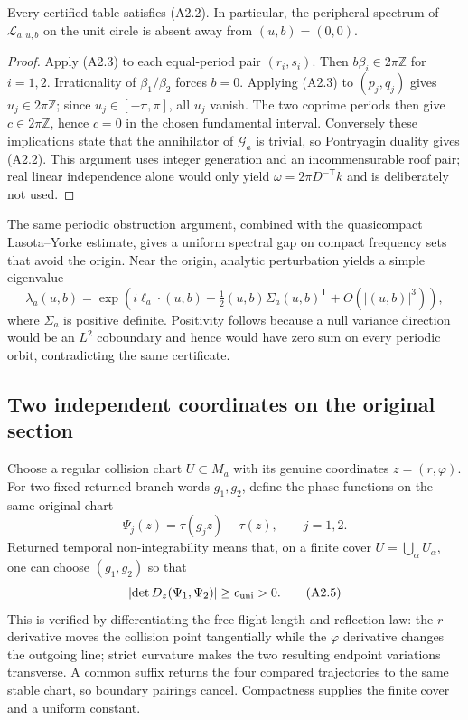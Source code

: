 \begin{lemma}
\label{lem:r23-a2-arithmetic}
Every certified table satisfies (A2.2).  In particular, the peripheral
spectrum of $\mathcal L_{a,u,b}$ on the unit circle is absent away from
$(u,b)=(0,0)$.
\end{lemma}

\begin{proof}
Apply (A2.3) to each equal-period pair $(r_i,s_i)$.  Then
$b\beta_i\in2\pi\mathbb Z$ for $i=1,2$.  Irrationality of
$\beta_1/\beta_2$ forces $b=0$.  Applying (A2.3) to $(p_j,q_j)$ gives
$u_j\in2\pi\mathbb Z$; since $u_j\in[-\pi,\pi]$, all $u_j$ vanish.  The two
coprime periods then give $c\in2\pi\mathbb Z$, hence $c=0$ in the chosen
fundamental interval.  Conversely these implications state that the
annihilator of $\mathscr G_a$ is trivial, so Pontryagin duality gives (A2.2).
This argument uses integer generation and an incommensurable roof pair; real
linear independence alone would only yield
$\omega=2\pi D^{-\mathsf T}k$ and is deliberately not used.
\end{proof}

The same periodic obstruction argument, combined with the quasicompact
Lasota--Yorke estimate, gives a uniform spectral gap on compact frequency sets
that avoid the origin.  Near the origin, analytic perturbation yields a simple
eigenvalue
\[
 \lambda_a(u,b)=
 \exp\left(i\ell_a\cdot(u,b)-\tfrac12
 (u,b)\Sigma_a(u,b)^{\mathsf T}+O(|(u,b)|^3)\right),       \tag{A2.4}
\]
where $\Sigma_a$ is positive definite.  Positivity follows because a null
variance direction would be an $L^2$ coboundary and hence would have zero sum
on every periodic orbit, contradicting the same certificate.

\subsection{Two independent coordinates on the original section}

Choose a regular collision chart $U\subset M_a$ with its genuine coordinates
$z=(r,\varphi)$.  For two fixed returned branch words $g_1,g_2$, define the
phase functions on the same original chart
\[
 \Psi_j(z)=\tau(g_jz)-\tau(z),\qquad j=1,2.
\]
Returned temporal non-integrability means that, on a finite cover
$U=\bigcup_\alpha U_\alpha$, one can choose $(g_1,g_2)$ so that
\[
 \left|\det D_z(\Psi_1,\Psi_2)\right|\ge c_{\rm uni}>0.    \tag{A2.5}
\]
This is verified by differentiating the free-flight length and reflection
law: the $r$ derivative moves the collision point tangentially while the
$\varphi$ derivative changes the outgoing line; strict curvature makes the
two resulting endpoint variations transverse.  A common suffix returns the
four compared trajectories to the same stable chart, so boundary pairings
cancel.  Compactness supplies the finite cover and a uniform constant.

